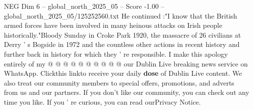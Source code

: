 \begin{textsample}{NEG Dim 6 – global\_north\_2025\_05 – Score -1.00 – global\_north\_2025\_05/125252560.txt}
He continued :"I know that the British armed forces have been involved in many heinous attacks on Irish people historically."Bloody Sunday in Croke Park 1920, the massacre of 26 civilians at Derry ' s Bogside in 1972 and the countless other actions in recent history and further back in history for which they ' re responsible.
I make this apology entirely of my @ @ @ @ @ @ @ @ @ @ our Dublin Live breaking news service on WhatsApp.
Clickthis linkto receive your daily \textbf{dose} of Dublin Live content.
We also treat our community members to special offers, promotions, and adverts from us and our partners.
If you don't like our community, you can check out any time you like.
If you ' re curious, you can read ourPrivacy Notice.

\end{textsample}
